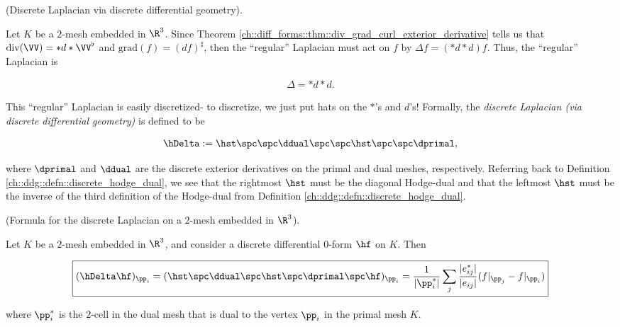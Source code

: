 \begin{defn}
    (Discrete Laplacian via discrete differential geometry).
    
    Let $K$ be a $2$-mesh embedded in $\R^3$. Since Theorem \ref{ch::diff_forms::thm::div_grad_curl_exterior_derivative} tells us that $\text{div}(\VV) = *d*\VV^\flat$ and $\text{grad}(f) = (df)^\sharp$, then the ``regular'' Laplacian must act on $f$ by $\Delta f = (*d*d)f$. Thus, the ``regular'' Laplacian is
    
    \begin{align*}
        \Delta = *d*d.
    \end{align*}
    
    This ``regular'' Laplacian is easily discretized- to discretize, we just put hats on the $*$'s and $d$'s! Formally, the \textit{discrete Laplacian (via discrete differential geometry)} is defined to be
    
    \begin{align*}
        \hDelta := \hst \spc \spc \ddual \spc \spc \hst \spc \spc \dprimal,
    \end{align*}
    
    where $\dprimal$ and $\ddual$ are the discrete exterior derivatives on the primal and dual meshes, respectively. Referring back to Definition \ref{ch::ddg::defn::discrete_hodge_dual}, we see that the rightmost $\hst$ must be the diagonal Hodge-dual and that the leftmost $\hst$ must be the inverse of the third definition of the Hodge-dual from Definition \ref{ch::ddg::defn::discrete_hodge_dual}.
\end{defn}

\begin{theorem}
    (Formula for the discrete Laplacian on a $2$-mesh embedded in $\R^3$).

    Let $K$ be a $2$-mesh embedded in $\R^3$, and consider a discrete differential $0$-form $\hf$ on $K$. Then 
    
    \begin{align*}
        \boxed
        {
            (\hDelta \hf)_{\pp_i} = (\hst \spc \ddual \spc \hst \spc \dprimal \spc \hf)_{\pp_i} = \frac{1}{|\pp_i^*|} \sum_j \frac{|e_{ij}^*|}{|e_{ij}|}(f|_{\pp_j} - f|_{\pp_i})
        }
    \end{align*}
    
    where $\pp_i^*$ is the $2$-cell in the dual mesh that is dual to the vertex $\pp_i$ in the primal mesh $K$.
\end{theorem}

